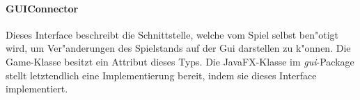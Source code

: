 \paragraph{GUIConnector}
\label{par:guiConnector}
Dieses Interface beschreibt die Schnittstelle, welche vom Spiel selbst ben"otigt wird, um Ver"anderungen des Spielstands auf der Gui darstellen zu k"onnen. Die Game-Klasse besitzt ein Attribut dieses Typs. Die JavaFX-Klasse im \emph{gui}-Package stellt letztendlich eine Implementierung bereit, indem sie dieses Interface implementiert. 